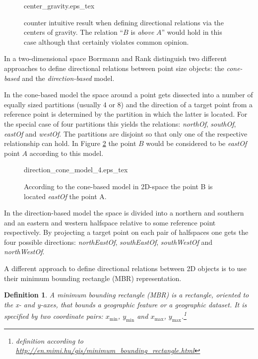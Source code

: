 \documentclass[paper=a4, fontsize=11pt]{scrartcl} %
\numberwithin{equation}{section} %
\numberwithin{figure}{section} %
\numberwithin{table}{section} %
\newtheorem{mydef}{Definition}
\begin{document}
\begin{figure}
  \centering
  \def\svgwidth{10em}
  {center_gravity.eps_tex}
  \caption{counter intuitive result when defining directional relations via the centers of gravity. The relation ``$B$ is \emph{above} $A$'' would hold in this case although that certainly violates common opinion.  }
\label{fig:center_gravity}
\end{figure}

In a two-dimensional space Borrmann and Rank \cite{Borrmann:2009:AEI} distinguish two different approaches to define directional relations between point size objects: the \textit{cone-based} and the \textit{direction-based} model. 

In the cone-based model the space around a point gets dissected into a number of equally sized partitions (usually 4 or 8) and the direction of a target point from a reference point is determined by the partition in which the latter is located. For the special case of four partitions this yields the relations: \emph{northOf}, \emph{southOf}, \emph{eastOf} and \emph{westOf}. The partitions are disjoint so that only one of the respective relationship can hold. In Figure \ref{fig:direction_cone_model_4} the point $B$ would be considered to be \emph{eastOf} point $A$ according to this model. 

\begin{figure}
  \centering
  \def\svgwidth{15em}
  {direction_cone_model_4.eps_tex}
  \caption{According to the cone-based model in 2D-space the point B is located \emph{eastOf} the point A.}
\label{fig:direction_cone_model_4}
\end{figure}

In the direction-based model the space is divided into a northern and southern and an eastern and western halfspace relative to some reference point respectively. By projecting a target point on each pair of halfspaces one gets the four possible directions: \emph{northEastOf}, \emph{southEastOf}, \emph{southWestOf} and \emph{northWestOf}. 

A different approach to define directional relations between 2D objects is to use their minimum bounding rectangle (MBR) representation.

\begin{mydef}
  A minimum bounding rectangle (MBR) is a rectangle, oriented to the x- and y-axes, that bounds a geographic feature or a geographic dataset. It is specified by two coordinate pairs: $x_{\mathrm{min}}$, $y_{\mathrm{min}}$ and $x_{\mathrm{max}}$, $y_{\mathrm{max}}$.\footnote{definition according to \url{http://en.mimi.hu/gis/minimum_bounding_rectangle.html}}
\end{mydef}
\end{document}
